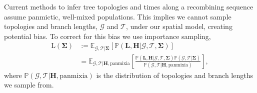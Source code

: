 \documentclass[12pt]{article}
\begin{document}
Current methods to infer tree topologies and times along a recombining sequence \citep{rasmussen2014genome,speidel2019method,kelleher2019inferring,wohns2021unified} assume panmictic, well-mixed populations. 
This implies we cannot sample topologies and branch lengths, $\mathcal{G}$ and $\mathcal{T}$, under our spatial model, creating potential bias.
To correct for this bias we use importance sampling,
%
\begin{equation}
\begin{aligned}
\mathrm{L}(\mathbf{\Sigma}) &:= \mathbb{E}_{\mathcal{G}, \mathcal{T} | \mathbf{\Sigma}} \left[ \mathbb{P}(\mathbf{L},\mathbf{H} | \mathcal{G},\mathcal{T},\mathbf{\Sigma}) \right] \\
&= \mathbb{E}_{ \mathcal{G}, \mathcal{T} | \mathbf{H}, \mathrm{panmixia}} \left[ \frac{\mathbb{P}(\mathbf{L},\mathbf{H} | \mathcal{G}, \mathcal{T},\mathbf{\Sigma}) \mathbb{P}(\mathcal{G}, \mathcal{T} | \mathbf{\Sigma})}{\mathbb{P}(\mathcal{G}, \mathcal{T} | \mathbf{H}, \mathrm{panmixia})} \right],
\end{aligned}
\end{equation}
%
where $\mathbb{P}(\mathcal{G}, \mathcal{T} | \mathbf{H}, \mathrm{panmixia})$ is the distribution of topologies and branch lengths we sample from.
\end{document}
